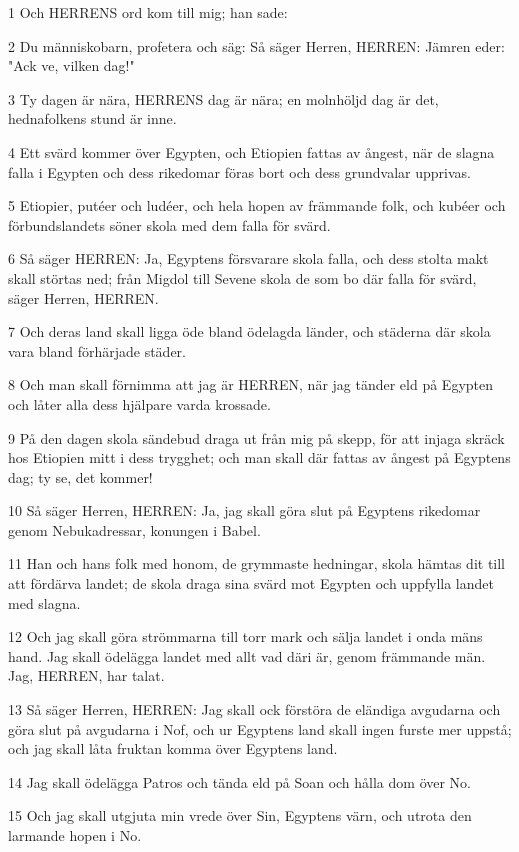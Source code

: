 \par 1 Och HERRENS ord kom till mig; han sade:
\par 2 Du människobarn, profetera och säg: Så säger Herren, HERREN: Jämren eder: "Ack ve, vilken dag!"
\par 3 Ty dagen är nära, HERRENS dag är nära; en molnhöljd dag är det, hednafolkens stund är inne.
\par 4 Ett svärd kommer över Egypten, och Etiopien fattas av ångest, när de slagna falla i Egypten och dess rikedomar föras bort och dess grundvalar upprivas.
\par 5 Etiopier, putéer och ludéer, och hela hopen av främmande folk, och kubéer och förbundslandets söner skola med dem falla för svärd.
\par 6 Så säger HERREN: Ja, Egyptens försvarare skola falla, och dess stolta makt skall störtas ned; från Migdol till Sevene skola de som bo där falla för svärd, säger Herren, HERREN.
\par 7 Och deras land skall ligga öde bland ödelagda länder, och städerna där skola vara bland förhärjade städer.
\par 8 Och man skall förnimma att jag är HERREN, när jag tänder eld på Egypten och låter alla dess hjälpare varda krossade.
\par 9 På den dagen skola sändebud draga ut från mig på skepp, för att injaga skräck hos Etiopien mitt i dess trygghet; och man skall där fattas av ångest på Egyptens dag; ty se, det kommer!
\par 10 Så säger Herren, HERREN: Ja, jag skall göra slut på Egyptens rikedomar genom Nebukadressar, konungen i Babel.
\par 11 Han och hans folk med honom, de grymmaste hedningar, skola hämtas dit till att fördärva landet; de skola draga sina svärd mot Egypten och uppfylla landet med slagna.
\par 12 Och jag skall göra strömmarna till torr mark och sälja landet i onda mäns hand. Jag skall ödelägga landet med allt vad däri är, genom främmande män. Jag, HERREN, har talat.
\par 13 Så säger Herren, HERREN: Jag skall ock förstöra de eländiga avgudarna och göra slut på avgudarna i Nof, och ur Egyptens land skall ingen furste mer uppstå; och jag skall låta fruktan komma över Egyptens land.
\par 14 Jag skall ödelägga Patros och tända eld på Soan och hålla dom över No.
\par 15 Och jag skall utgjuta min vrede över Sin, Egyptens värn, och utrota den larmande hopen i No.
